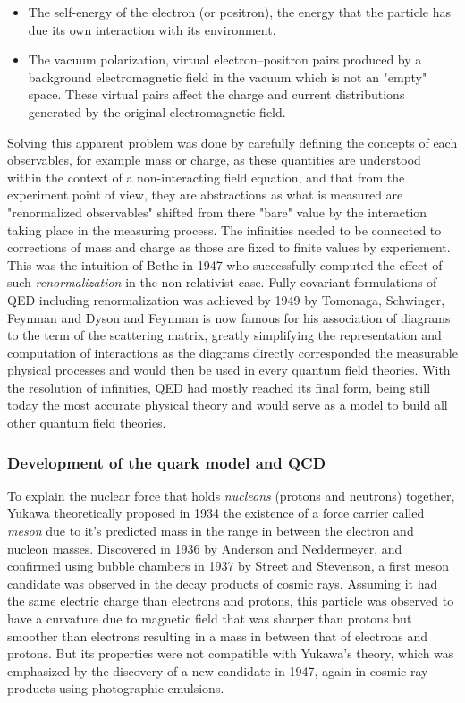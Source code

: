 	\begin{itemize}
		\item The self-energy of the electron (or positron), the energy that the particle has due its own interaction with its environment.
		\item The vacuum polarization, virtual electron–positron pairs produced by a background electromagnetic field in the vacuum which is not an "empty" space. These virtual pairs affect the charge and current distributions generated by the original electromagnetic field.
	\end{itemize}
	
	Solving this apparent problem was done by carefully defining the concepts of each observables, for example mass or charge, as these quantities are understood within the context of a non-interacting field equation, and that from the experiment point of view, they are abstractions as what is measured are "renormalized observables" shifted from there "bare" value by the interaction taking place in the measuring process. The infinities needed to be connected to corrections of mass and charge as those are fixed to finite values by experiement. This was the intuition of Bethe in 1947 who successfully computed the effect of such \textit{renormalization} in the non-relativist case. Fully covariant formulations of QED including renormalization was achieved by 1949 by Tomonaga, Schwinger, Feynman and Dyson and Feynman is now famous for his association of diagrams to the term of the scattering matrix, greatly simplifying the representation and computation of interactions as the diagrams directly corresponded the measurable physical processes and would then be used in every quantum field theories. With the resolution of infinities, QED had mostly reached its final form, being still today the most accurate physical theory and would serve as a model to build all other quantum field theories.
	
	\subsubsection*{Development of the quark model and \acl{QCD}}
	\label{chapt2:sssec:quark}
	
	To explain the nuclear force that holds \textit{nucleons} (protons and neutrons) together, Yukawa theoretically proposed in 1934 the existence of a force carrier called \textit{meson} due to it's predicted mass in the range in between the electron and nucleon masses. Discovered in 1936 by Anderson and Neddermeyer, and confirmed using bubble chambers in 1937 by Street and Stevenson, a first meson candidate was observed in the decay products of cosmic rays. Assuming it had the same electric charge than electrons and protons, this particle was observed to have a curvature due to magnetic field that was sharper than protons but smoother than electrons resulting in a mass in between that of electrons and protons. But its properties were not compatible with Yukawa's theory, which was emphasized by the discovery of a new candidate in 1947, again in cosmic ray products using photographic emulsions.
	
